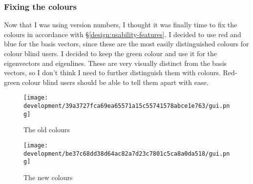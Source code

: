 \documentclass[../development.tex]{subfiles}
\begin{document}
\subsubsection{Fixing the colours\label{development:fumbling-with-semver:fixing-the-colours}}

Now that I was using version numbers, I thought it was finally time to fix the colours in accordance with \S\ref{design:usability-features}. I decided to use red and blue for the basis vectors, since these are the most easily distinguished colours for colour blind users. I decided to keep the green colour and use it for the eigenvectors and eigenlines. These are very visually distinct from the basis vectors, so I don't think I need to further distinguish them with colours. Red-green colour blind users should be able to tell them apart with ease.

\begin{figure}[H]
	\centering
	\texttt{[image: development/39a3727fca69ea65571a15c55741578abce1e763/gui.png]}
	\caption{The old colours}
	\label{fig:development:39a3727fca69ea65571a15c55741578abce1e763:gui.png}
\end{figure}

\begin{figure}[H]
	\centering
	\texttt{[image: development/be37c68dd38d64ac82a7d23c7801c5ca8a0da518/gui.png]}
	\caption{The new colours}
	\label{fig:development:be37c68dd38d64ac82a7d23c7801c5ca8a0da518:gui.png}
\end{figure}
\end{document}
